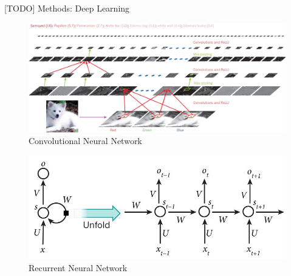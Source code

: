 \documentclass[final,hyperref={pdfpagelabels=false}]{beamer}
\begin{document}
\begin{frame}[t]
\begin{columns}[t]
\begin{column}{.465\textwidth}
\begin{block}{[TODO] Methods: Deep Learning}
\begin{figure}
\includegraphics[width=.9\linewidth]{nature-deep-learning/fig_2}
\caption{Convolutional Neural Network \cite{lecun2015deep}}
\end{figure}

\begin{figure}
\includegraphics[width=.6\linewidth]{nature-deep-learning/fig_5}
\caption{Recurrent Neural Network \cite{lecun2015deep}}
\end{figure}


\end{block}
\end{column}
\end{columns}
\end{frame}
\end{document}
